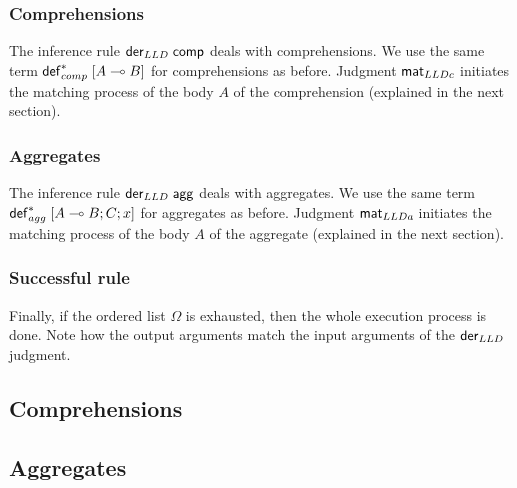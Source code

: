 \subsubsection{Comprehensions}

The inference rule $\mathsf{der}_{LLD} \; \mathsf{comp}$ deals with comprehensions. We use the same
term \mbox{$\mathsf{def}_{comp}^{*} \; [A \multimap B]$} for comprehensions as before.  Judgment $\mathsf{mat}_{LLDc} \;$initiates the
matching process of the body $A$ of the comprehension (explained in the next
section).



\subsubsection{Aggregates}

The inference rule $\mathsf{der}_{LLD} \; \mathsf{agg}$ deals with aggregates. We use the same term
\mbox{$\mathsf{def}_{agg}^{*} \; [A \multimap B ; C; x]$} for aggregates as before. Judgment $\mathsf{mat}_{LLDa} \;$initiates the
matching process of the body $A$ of the aggregate (explained in the next
section).



\subsubsection{Successful rule}

Finally, if the ordered list $\Omega$ is exhausted, then the whole execution
process is done.  Note how the output arguments match the input arguments of the
$\mathsf{der}_{LLD} \;$judgment.



\subsection{Comprehensions}


\subsection{Aggregates}


